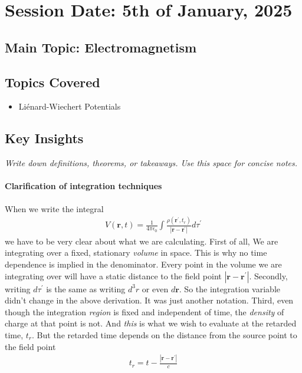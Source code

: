 \section{Session Date: 5th of January, 2025}
\subsection*{Main Topic: Electromagnetism}
\subsection*{Topics Covered}
\begin{itemize}
    \item Liénard-Wiechert Potentials
\end{itemize}

\subsection*{Key Insights}
\textit{Write down definitions, theorems, or takeaways. Use this space for concise notes.}
\paragraph{Clarification of integration techniques} When we write the integral \begin{align*}
    V(\mathbf{r}, t) = \frac{1}{4\pi\epsilon_0} \int \frac{\rho (\mathbf{r}^{\prime}, t_r)}{\left| \mathbf{r} - \mathbf{r}^{\prime}  \right| } d \tau ^{\prime} 
\end{align*}
we have to be very clear about what we are calculating. First of all, We are integrating over a fixed, stationary \textit{volume} in space. This is why no time dependence is implied in the denominator. Every point in the volume we are integrating over will have a static distance to the field point \(\left| \mathbf{r} - \mathbf{r}^{\prime} \right| \). Secondly, writing \(d \tau ^{\prime} \) is the same as writing \(d^3 r\) or even \(d \mathbf{r}\). So the integration variable didn't change in the above derivation. It was just another notation. Third, even though the integration \textit{region} is fixed and independent of time, the \textit{density} of charge at that point is not. And \emph{this} is what we wish to evaluate at the retarded time, \(t_r\). But the retarded time depends on the distance from the source point to the field point \begin{align*}
    t_r = t - \frac{\left| \mathbf{r} - \mathbf{r}^{\prime}\right| }{c}
\end{align*} 

